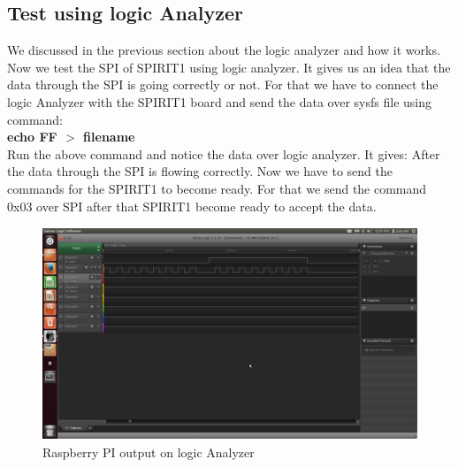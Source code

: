 \subsection{Test using logic Analyzer}
We discussed in the previous section about the logic analyzer and how it works. Now we test the SPI of SPIRIT1 using logic analyzer. It gives us an idea that the data through the SPI is going correctly or not. For that we have to connect the logic Analyzer with the SPIRIT1 board and send the data over sysfs file using command:\\
\textbf{echo FF $>$ filename}\\
Run the above command and notice the data over logic analyzer. It gives:
After the data through the SPI is flowing correctly. Now we have to send the commands for the SPIRIT1 to become ready. For that we send the command 0x03 over SPI after that SPIRIT1 become ready to accept the data. 
\begin{figure}[H]
	\centering
	\includegraphics[width=4.5in, height=2.5in]{images/raspberryoutput.png}
	\caption{Raspberry PI output on logic Analyzer}
\end{figure}
